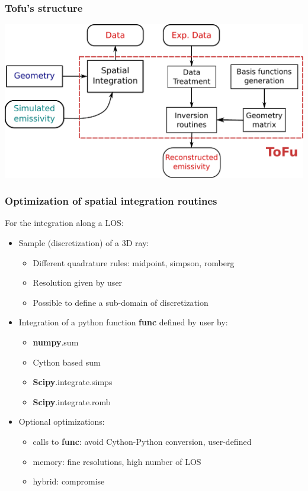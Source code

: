\documentclass[10pt]{beamer}
\begin{document}
\begin{frame}
\frametitle{Tofu's structure}

\begin{center}
    	\includegraphics[width=0.8\linewidth]{figures/tofu.pdf}
\end{center}
	
\end{frame}



\begin{frame}
\frametitle{Optimization of spatial integration routines}

For the integration along a LOS:
	\begin{itemize}
	\item Sample (discretization) of a 3D ray:
		\begin{itemize}
		\item Different quadrature rules: midpoint, simpson, romberg
		\item Resolution given by user
		\item Possible to define a sub-domain of discretization
		\end{itemize}
	\item Integration of a python function \textbf{func} defined by user by:
		\begin{itemize}
		\item \textbf{numpy}.sum
		\item Cython based sum
		\item \textbf{Scipy}.integrate.simps
		\item \textbf{Scipy}.integrate.romb
		\end{itemize}
	\item Optional optimizations:
		\begin{itemize}
		\item calls to \textbf{func}: avoid Cython-Python conversion, user-defined
		\item memory: fine resolutions, high number of LOS
		\item hybrid: compromise
		\end{itemize}
	\end{itemize}
	
\end{frame}
\end{document}
